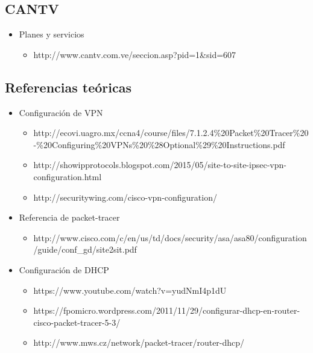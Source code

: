 \documentclass[]{article}
\begin{document}
\subsection{CANTV}\label{cantv}

\begin{itemize}
\itemsep1pt\parskip0pt
\item
  Planes y servicios

  \begin{itemize}
  \itemsep1pt\parskip0pt
  \item
    http://www.cantv.com.ve/seccion.asp?pid=1\&sid=607
  \end{itemize}
\end{itemize}

\subsection{Referencias teóricas}\label{referencias-teuxf3ricas}

\begin{itemize}
\itemsep1pt\parskip0pt
\item
  Configuración de VPN

  \begin{itemize}
  \itemsep1pt\parskip0pt
  \item
    http://ecovi.uagro.mx/ccna4/course/files/7.1.2.4\%20Packet\%20Tracer\%20-\%20Configuring\%20VPNs\%20\%28Optional\%29\%20Instructions.pdf
  \item
    http://showipprotocols.blogspot.com/2015/05/site-to-site-ipsec-vpn-configuration.html
  \item
    http://securitywing.com/cisco-vpn-configuration/
  \end{itemize}
\item
  Referencia de packet-tracer

  \begin{itemize}
  \itemsep1pt\parskip0pt
  \item
    http://www.cisco.com/c/en/us/td/docs/security/asa/asa80/configuration/guide/conf\_gd/site2sit.pdf
  \end{itemize}
\item
  Configuración de DHCP

  \begin{itemize}
  \itemsep1pt\parskip0pt
  \item
    https://www.youtube.com/watch?v=yudNmI4p1dU
  \item
    https://fpomicro.wordpress.com/2011/11/29/configurar-dhcp-en-router-cisco-packet-tracer-5-3/
  \item
    http://www.mws.cz/network/packet-tracer/router-dhcp/
  \end{itemize}
\end{itemize}
\end{document}
